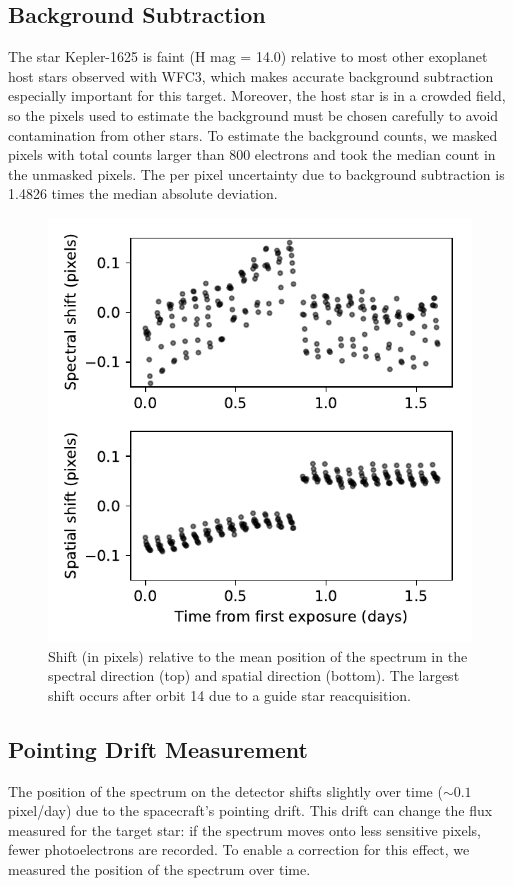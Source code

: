 \documentclass[twocolumn]{aastex62}
\begin{document}
\subsection{Background Subtraction} 
\label{sec:background} 
The star Kepler-1625 is faint (H mag = 14.0) relative to most other exoplanet host stars observed with WFC3, which makes accurate background subtraction especially important for this target. Moreover, the host star is in a crowded field, so the pixels used to estimate the background must be chosen carefully to avoid contamination from other stars.  To estimate the background counts, we masked pixels with total counts larger than 800 electrons and took the median count in the unmasked pixels. The per pixel uncertainty due to background subtraction is 1.4826 times the median absolute deviation.




\begin{figure}
\includegraphics[width = 0.5 \textwidth]{figures/fig4_shifts.pdf}
    \caption{Shift (in pixels) relative to the mean position of the spectrum in the spectral direction (top) and spatial direction (bottom). The largest shift occurs after orbit 14 due to a guide star reacquisition.}
\label{fig:shifts}
\end{figure}

\subsection{Pointing Drift Measurement}
The position of the spectrum on the detector shifts slightly over time ($\sim0.1$ pixel/day) due to the spacecraft's pointing drift. This drift can change the flux measured for the target star: if the spectrum moves onto less sensitive pixels, fewer photoelectrons are recorded. To enable a correction for this effect, we measured the position of the spectrum over time.  
\end{document}
